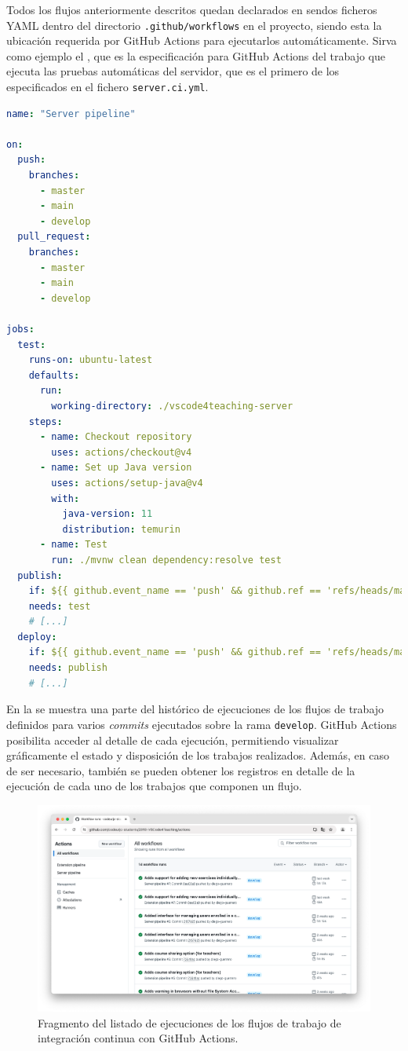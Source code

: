 Todos los flujos anteriormente descritos quedan declarados en sendos ficheros YAML dentro del directorio \texttt{.github/workflows} en el proyecto, siendo esta la ubicación requerida por GitHub Actions para ejecutarlos automáticamente. Sirva como ejemplo el , que es la especificación para GitHub Actions del trabajo que ejecuta las pruebas automáticas del servidor, que es el primero de los especificados en el fichero \texttt{server.ci.yml}.

\begin{lstlisting}[language=YAML,caption={Fragmento del flujo de trabajo de acciones automáticas relativas a la integración continua del servidor.},label=cod:ciGitHubTestServer]
name: "Server pipeline"

on:
  push:
    branches:
      - master
      - main
      - develop
  pull_request:
    branches:
      - master
      - main
      - develop

jobs:
  test:
    runs-on: ubuntu-latest
    defaults:
      run:
        working-directory: ./vscode4teaching-server
    steps:
      - name: Checkout repository
        uses: actions/checkout@v4
      - name: Set up Java version
        uses: actions/setup-java@v4
        with:
          java-version: 11
          distribution: temurin
      - name: Test
        run: ./mvnw clean dependency:resolve test
  publish:
    if: ${{ github.event_name == 'push' && github.ref == 'refs/heads/main' }}
    needs: test
    # [...]   
  deploy:
    if: ${{ github.event_name == 'push' && github.ref == 'refs/heads/main' }}
    needs: publish
    # [...]
\end{lstlisting}

En la  se muestra una parte del histórico de ejecuciones de los flujos de trabajo definidos para varios \textit{commits} ejecutados sobre la rama \texttt{develop}. GitHub Actions posibilita acceder al detalle de cada ejecución, permitiendo visualizar gráficamente el estado y disposición de los trabajos realizados. Además, en caso de ser necesario, también se pueden obtener los registros en detalle de la ejecución de cada uno de los trabajos que componen un flujo.

\begin{figure}[h]
    \centering
    \includegraphics[width=\textwidth]{imagenes/utilizadas/4-3-implementacion/rn5-1.png}
    \caption{Fragmento del listado de ejecuciones de los flujos de trabajo de integración continua con GitHub Actions.}
    \label{fig:reqn5-1}
\end{figure}

